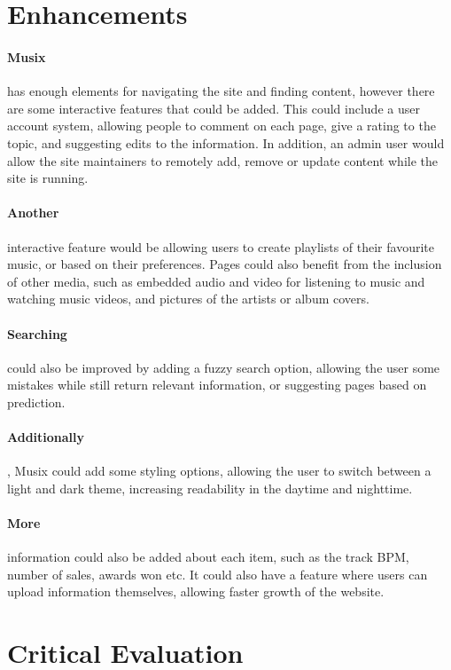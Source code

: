 \documentclass[10pt, a4paper]{article}
\begin{document}
    \newpage
    \section{Enhancements}
    \paragraph{Musix} has enough elements for navigating the site and finding content, however there are some interactive features that could be added. This could include a user account system, allowing people to comment on each page, give a rating to the topic, and suggesting edits to the information. In addition, an admin user would allow the site maintainers to remotely add, remove or update content while the site is running.
    \paragraph{Another} interactive feature would be allowing users to create playlists of their favourite music, or based on their preferences. Pages could also benefit from the inclusion of other media, such as embedded audio and video for listening to music and watching music videos, and pictures of the artists or album covers.
    \paragraph{Searching} could also be improved by adding a fuzzy search option, allowing the user some mistakes while still return relevant information, or suggesting pages based on prediction.
    \paragraph{Additionally}, Musix could add some styling options, allowing the user to switch between a light and dark theme, increasing readability in the daytime and nighttime.
    \paragraph{More} information could also be added about each item, such as the track BPM, number of sales, awards won etc. It could also have a feature where users can upload information themselves, allowing faster growth of the website.
    
    \section{Critical Evaluation}
\end{document}
